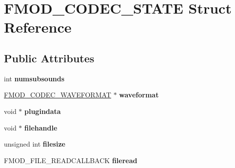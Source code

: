 \hypertarget{struct_f_m_o_d___c_o_d_e_c___s_t_a_t_e}{}\section{F\+M\+O\+D\+\_\+\+C\+O\+D\+E\+C\+\_\+\+S\+T\+A\+TE Struct Reference}
\label{struct_f_m_o_d___c_o_d_e_c___s_t_a_t_e}
\subsection*{Public Attributes}
\begin{DoxyCompactItemize}
\item 
int {\bfseries numsubsounds}\hypertarget{struct_f_m_o_d___c_o_d_e_c___s_t_a_t_e_af9c17a02d9b967fa0ececf991a654dfd}{}\label{struct_f_m_o_d___c_o_d_e_c___s_t_a_t_e_af9c17a02d9b967fa0ececf991a654dfd}

\item 
\hyperlink{struct_f_m_o_d___c_o_d_e_c___w_a_v_e_f_o_r_m_a_t}{F\+M\+O\+D\+\_\+\+C\+O\+D\+E\+C\+\_\+\+W\+A\+V\+E\+F\+O\+R\+M\+AT} $\ast$ {\bfseries waveformat}\hypertarget{struct_f_m_o_d___c_o_d_e_c___s_t_a_t_e_a785115172e17e38c3baf764e8f67b962}{}\label{struct_f_m_o_d___c_o_d_e_c___s_t_a_t_e_a785115172e17e38c3baf764e8f67b962}

\item 
void $\ast$ {\bfseries plugindata}\hypertarget{struct_f_m_o_d___c_o_d_e_c___s_t_a_t_e_a8201fa8b60e1cf571ac0d66e678b3928}{}\label{struct_f_m_o_d___c_o_d_e_c___s_t_a_t_e_a8201fa8b60e1cf571ac0d66e678b3928}

\item 
void $\ast$ {\bfseries filehandle}\hypertarget{struct_f_m_o_d___c_o_d_e_c___s_t_a_t_e_af70df892eb7bc2cb3b29854536fad747}{}\label{struct_f_m_o_d___c_o_d_e_c___s_t_a_t_e_af70df892eb7bc2cb3b29854536fad747}

\item 
unsigned int {\bfseries filesize}\hypertarget{struct_f_m_o_d___c_o_d_e_c___s_t_a_t_e_af314546d98e746687bfeaae8a59f792c}{}\label{struct_f_m_o_d___c_o_d_e_c___s_t_a_t_e_af314546d98e746687bfeaae8a59f792c}

\item 
F\+M\+O\+D\+\_\+\+F\+I\+L\+E\+\_\+\+R\+E\+A\+D\+C\+A\+L\+L\+B\+A\+CK {\bfseries fileread}\hypertarget{struct_f_m_o_d___c_o_d_e_c___s_t_a_t_e_a5ae058ad0c24eb2766b30a56e63dc6d1}{}\label{struct_f_m_o_d___c_o_d_e_c___s_t_a_t_e_a5ae058ad0c24eb2766b30a56e63dc6d1}


\end{DoxyCompactItemize}
